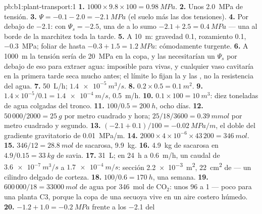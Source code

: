 \begin{solution}{pb:b1:plant-transport:1}
\textbf{1.} $1000\times 9.8\times 100 = \qty{0.98}{MPa}$.
\textbf{2.} Unos \qty{2.0}{MPa} de tensión.
\textbf{3.} $\Psi = -0.1 - 2.0 = \qty{-2.1}{MPa}$ (el suelo más las dos
tensiones).
\textbf{4.} Por debajo de \qty{-2.1}{}: con $\Psi_s = -2.5$, una 
de a lo sumo $-2.1 + 2.5 = \qty{0.4}{MPa}$ --- una  al borde de la
marchitez toda la tarde.
\textbf{5.} A \qty{10}{m}: gravedad \qty{0.1}{}, rozamiento \qty{0.1}{},
 \qty{-0.3}{MPa};  foliar de hasta $-0.3 + 1.5 = \qty{1.2}{MPa}$: cómodamente turgente.
\textbf{6.} A \qty{1000}{m} la tensión sería de \qty{20}{MPa} en la copa, y
las  necesitarían un $\Psi_s$ por debajo de eso para extraer agua:
imposible para  vivas, y cualquier vaso cavitaría en la primera tarde
seca mucho antes; el límite lo fijan la  y las , no la
resistencia del agua.
\textbf{7.} \qty{50}{L/h}; $\qty{1.4e-5}{m^3/s}$.
\textbf{8.} $0.2\times 0.5 = \qty{0.1}{m^2}$.
\textbf{9.} $1.4\times 10^{-5}/0.1 = \qty{1.4e-4}{m/s}$, \qty{0.5}{m/h}.
\textbf{10.} $0.1\times 100 = \qty{10}{m^3}$: diez toneladas de agua colgadas del tronco.
\textbf{11.} $100/0.5 = \qty{200}{h}$, ocho días.
\textbf{12.} $50\,000/2000 = \qty{25}{g}$ por metro cuadrado y hora;
$25/18/3600 = \qty{0.39}{mmol}$ por metro cuadrado y segundo.
\textbf{13.} $(-2.1 + 0.1)/100 = \qty{-0.02}{MPa/m}$, el doble del
gradiente gravitatorio de \qty{0.01}{MPa/m}.
\textbf{14.} $2000\times 4\times 10^{-6}\times 43\,200 = \qty{346}{mol}$.
\textbf{15.} $346/12 = \qty{28.8}{mol}$ de sacarosa, \qty{9.9}{kg}.
\textbf{16.} \qty{4.9}{kg} de sacarosa en $4.9/0.15 = \qty{33}{kg}$ de
savia.
\textbf{17.} \qty{31}{L}; en \qty{24}{h} a \qty{0.6}{m/h}, un caudal de
$\qty{3.6e-7}{m^3/s}$ a $\qty{1.7e-4}{m/s}$: sección \qty{2.2e-3}{m^2},
\qty{22}{cm^2} de  --- un cilindro delgado de corteza.
\textbf{18.} $100/0.6 = \qty{170}{h}$, una semana.
\textbf{19.} $600\,000/18 = \qty{33000}{mol}$ de agua por \qty{346}{mol} de
$\mathrm{CO_2}$: unos 96 a 1 --- poco para una planta C3, porque la copa de
una secuoya vive en un aire costero húmedo.
\textbf{20.} $-1.2 + 1.0 = \qty{-0.2}{MPa}$ frente a los \qty{-2.1}{} del

\end{solution}
